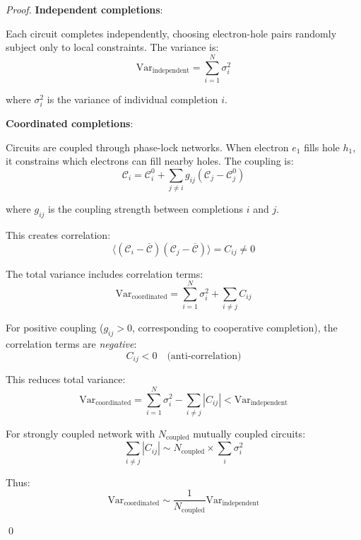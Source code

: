 \begin{proof}
\textbf{Independent completions}:

Each circuit completes independently, choosing electron-hole pairs randomly subject only to local constraints. The variance is:
\begin{equation}
\text{Var}_{\text{independent}} = \sum_{i=1}^{N} \sigma_i^2
\end{equation}

where $\sigma_i^2$ is the variance of individual completion $i$.

\textbf{Coordinated completions}:

Circuits are coupled through phase-lock networks. When electron $e_1$ fills hole $h_1$, it constrains which electrons can fill nearby holes. The coupling is:
\begin{equation}
\mathcal{C}_i = \mathcal{C}_i^0 + \sum_{j \neq i} g_{ij} (\mathcal{C}_j - \mathcal{C}_j^0)
\end{equation}

where $g_{ij}$ is the coupling strength between completions $i$ and $j$.

This creates correlation:
\begin{equation}
\langle (\mathcal{C}_i - \overline{\mathcal{C}}) (\mathcal{C}_j - \overline{\mathcal{C}}) \rangle = C_{ij} \neq 0
\end{equation}

The total variance includes correlation terms:
\begin{equation}
\text{Var}_{\text{coordinated}} = \sum_{i=1}^{N} \sigma_i^2 + \sum_{i \neq j} C_{ij}
\end{equation}

For positive coupling ($g_{ij} > 0$, corresponding to cooperative completion), the correlation terms are \textit{negative}:
\begin{equation}
C_{ij} < 0 \quad \text{(anti-correlation)}
\end{equation}

This reduces total variance:
\begin{equation}
\text{Var}_{\text{coordinated}} = \sum_{i=1}^{N} \sigma_i^2 - \sum_{i \neq j} |C_{ij}| < \text{Var}_{\text{independent}}
\end{equation}

For strongly coupled network with $N_{\text{coupled}}$ mutually coupled circuits:
\begin{equation}
\sum_{i \neq j} |C_{ij}| \sim N_{\text{coupled}} \times \sum_i \sigma_i^2
\end{equation}

Thus:
\begin{equation}
\text{Var}_{\text{coordinated}} \sim \frac{1}{N_{\text{coupled}}} \text{Var}_{\text{independent}}
\end{equation}

\qed
\end{proof}

